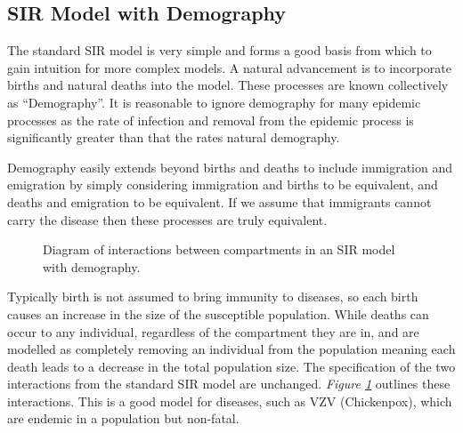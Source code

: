 \documentclass[11pt,a4paper]{article}
\theoremstyle{break}
\begin{document}
\subsection*{SIR Model with Demography}

  \par The standard SIR model is very simple and forms a good basis from which to gain intuition for more complex models. A natural advancement is to incorporate births and natural deaths into the model. These processes are known collectively as ``Demography''. It is reasonable to ignore demography for many epidemic processes as the rate of infection and removal from the epidemic process is significantly greater than that the rates natural demography.

  \par Demography easily extends beyond births and deaths to include immigration and emigration by simply considering immigration and births to be equivalent, and deaths and emigration to be equivalent. If we assume that immigrants cannot carry the disease then these processes are truly equivalent.

  \begin{figure}[H]
    \centering
    \caption{Diagram of interactions between compartments in an SIR model with demography.}
    \label{fig_sir_model_diagram_w_demography}
  \end{figure}

  \par Typically birth is not assumed to bring immunity to diseases, so each birth causes an increase in the size of the susceptible population. While deaths can occur to any individual, regardless of the compartment they are in, and are modelled as completely removing an individual from the population meaning each death leads to a decrease in the total population size. The specification of the two interactions from the standard SIR model are unchanged. \textit{Figure \ref{fig_sir_model_diagram_w_demography}} outlines these interactions. This is a good model for diseases, such as VZV (Chickenpox), which are endemic in a population but non-fatal.
\end{document}
